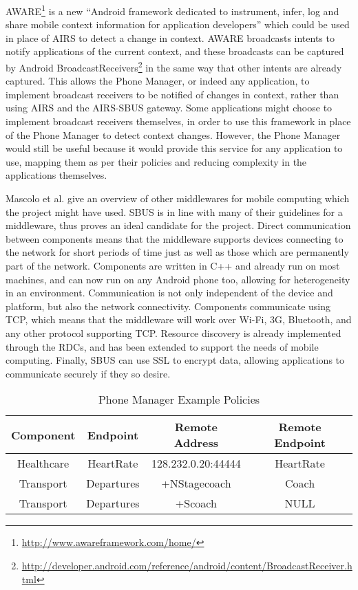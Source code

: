 \documentclass[12pt,twoside,notitlepage]{report}
\begin{document}
AWARE\footnote{\url{http://www.awareframework.com/home/}} is a new ``Android framework dedicated to instrument, infer, log and share mobile context information for application developers'' which could be used in place of AIRS to detect a change in context.
AWARE broadcasts intents to notify applications of the current context, and these broadcasts can be captured by Android BroadcastReceivers\footnote{\url{http://developer.android.com/reference/android/content/BroadcastReceiver.html}} in the same way that other intents are already captured. 
This allows the Phone Manager, or indeed any application, to implement broadcast receivers to be notified of changes in context, rather than using AIRS and the AIRS-SBUS gateway. 
Some applications might choose to implement broadcast receivers themselves, in order to use this framework in place of the Phone Manager to detect context changes.
However, the Phone Manager would still be useful because it would provide this service for any application to use, mapping them as per their policies and reducing complexity in the applications themselves.

Mascolo et al. give an overview of other middlewares for mobile computing \cite{mascolo2002mobile} which the project might have used. 
SBUS is in line with many of their guidelines for a middleware, thus proves an ideal candidate for the project. 
Direct communication between components means that the middleware supports devices connecting to the network for short periods of time just as well as those which are permanently part of the network. 
Components are written in C++ and already run on most machines, and can now run on any Android phone too, allowing for heterogeneity in an environment. 
Communication is not only independent of the device and platform, but also the network connectivity. 
Components communicate using TCP, which means that the middleware will work over Wi-Fi, 3G, Bluetooth, and any other protocol supporting TCP. 
Resource discovery is already implemented through the RDCs, and has been extended to support the needs of mobile computing. 
Finally, SBUS can use SSL to encrypt data, allowing applications to communicate securely if they so desire. 


\begin{table}
\centering

\begin{tabular}{c c c c}
\hline\hline
Component & Endpoint & Remote Address & Remote Endpoint \\
\hline

Healthcare & HeartRate & 128.232.0.20:44444 & HeartRate \\
Transport & Departures & +NStagecoach & Coach \\
Transport & Departures & +Scoach & NULL \\

\hline
\end{tabular}

\caption{Phone Manager Example Policies}
\label{tab:example_policies}
\end{table}
\end{document}
